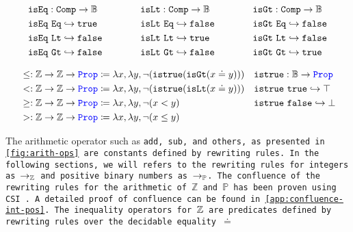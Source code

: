 \[
\begin{array}{l@{\hspace{4em}}l@{\hspace{4em}}l}
\begin{aligned}
  &\tt{isEq} : \tt{Comp} \ra \bb{B} \\
  &\tt{isEq}~\tt{Eq} \re \tt{true} \\
  &\tt{isEq}~\tt{Lt} \re \tt{false} \\
  &\tt{isEq}~\tt{Gt} \re \tt{false} \\
\end{aligned}
&
\begin{aligned}
  &\tt{isLt} : \tt{Comp} \ra \bb{B} \\
  &\tt{isLt}~\tt{Eq} \re \tt{false} \\
  &\tt{isLt}~\tt{Lt} \re \tt{true} \\
  &\tt{isLt}~\tt{Gt} \re \tt{false} \\
\end{aligned}
&
\begin{aligned}
  &\tt{isGt} : \tt{Comp} \ra \bb{B} \\
  &\tt{isGt}~\tt{Eq} \re \tt{false} \\
  &\tt{isGt}~\tt{Lt} \re \tt{false} \\
  &\tt{isGt}~\tt{Gt} \re \tt{true} \\
\end{aligned}
\end{array}
\]

\begin{align*}
&\leq: \mathbb{Z} \rightarrow \mathbb{Z} \rightarrow \textcolor{blue}{\texttt{\upshape{Prop}}}  \coloneq \lambda x,\lambda y, \neg (\texttt{istrue}(\texttt{isGt}(x \doteq y))) & &\texttt{istrue} : \mathbb{B} \rightarrow \textcolor{blue}{\texttt{\upshape{Prop}}} \\
&<: \mathbb{Z} \rightarrow \mathbb{Z} \rightarrow \textcolor{blue}{\texttt{\upshape{Prop}}}  \coloneq \lambda x,\lambda y, \neg (\texttt{istrue}(\texttt{isLt}(x \doteq y))) & &\texttt{istrue}~\texttt{true} \hookrightarrow \top \\
&\geq: \mathbb{Z} \rightarrow \mathbb{Z} \rightarrow \textcolor{blue}{\texttt{\upshape{Prop}}}  \coloneq \lambda x,\lambda y, \neg (x < y) & &\texttt{istrue}~\texttt{false} \hookrightarrow \bot \\
&>: \mathbb{Z} \rightarrow \mathbb{Z} \rightarrow \textcolor{blue}{\texttt{\upshape{Prop}}}  \coloneq \lambda x,\lambda y, \neg (x \leq y) & & \\
\end{align*}

The arithmetic operator such as \tt{add}, \tt{sub}, and others, as presented in \cref{fig:arith-ops} are constants defined by rewriting rules. In the following sections, we will refers 
to the rewriting rules for integers as $\rightarrow_\mathbb{Z}$ and positive binary numbers as $\rightarrow_\mathbb{P}$.
The confluence of the rewriting rules for the arithmetic of $\mathbb{Z}$ and $\mathbb{P}$ has been proven using CSI \cite{CSI}. A detailed proof of confluence can be found in \cref{app:confluence-int-pos}.
The inequality operators for $\mathbb{Z}$ are predicates defined by rewriting rules over the decidable equality $\doteq$

